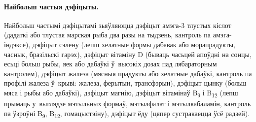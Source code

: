 \paragraph{Найбольш частыя дэфіцыты.}
Найбольш частымі дэфіцытамі зьяўляюцца дэфіцыт амэга-3 тлустых кіслот (дадаткі або тлустая марская рыба два разы на тыдзень, кантроль па амэга-індэксе), дэфіцыт сэлену (лепш хелатные формы дабавак або морапрадукты, часнык, бразільскі гарэх), дэфіцыт вітаміну D (бываць часьцей апоўдні на сонцы, есьці больш рыбы, яек або дабаўкі ў~высокіх дозах пад лябараторным кантролем), дэфіцыт жалеза (мясныя прадукты або хелатные дабаўкі, кантроль па профілі жалеза ў~крыві: жалеза, ферытын, трансфэрын), дэфіцыт цынку (больш мяса і рыбы або дабаўкі), дэфіцыт магнію, дэфіцыт вітамінаў B\textsubscript{9} і B\textsubscript{12} (лепш прымаць у~выглядзе мэтыльных формаў, мэтылфалат і мэтылкабаламін, кантроль па ўзроўні B\textsubscript{9}, B\textsubscript{12}, гомацыстэіну), дэфіцыт ёду (цяпер сустракаецца ўсё радзей).

